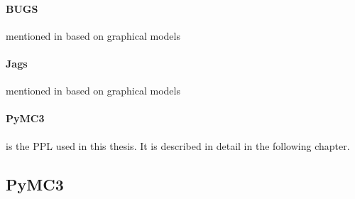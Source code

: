 \documentclass{article}
\begin{document}
\paragraph{BUGS}
mentioned in \cite{Gelman_2015}
based on graphical models
\paragraph{Jags}
mentioned in \cite{Gelman_2015}
based on graphical models
\paragraph{PyMC3}
is the PPL used in this thesis. It is described in detail in the following chapter.




\subsection{PyMC3}
\end{document}
